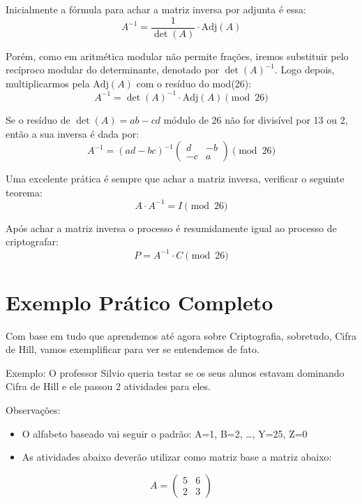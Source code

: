 \documentclass[a4paper,12pt,twocolumn]{article}
\begin{document}
Inicialmente a fórmula para achar a matriz inversa por adjunta é essa:
\begin{equation}
A^{-1} = \frac{1}{\det(A)} \cdot \text{Adj}(A)
\end{equation}

Porém, como em aritmética modular não permite frações, iremos substituir pelo recíproco modular do determinante, denotado por $\det(A)^{-1}$. Logo depois, multiplicarmos pela $\text{Adj}(A)$ com o resíduo do mod(26):
\begin{equation}
A^{-1} = \det(A)^{-1} \cdot \text{Adj}(A) \pmod{26}
\end{equation}

Se o resíduo de $\det(A) = ab - cd$ módulo de 26 não for divisível por 13 ou 2, então a sua inversa é dada por:
\begin{equation}
A^{-1} = (ad-bc)^{-1} \begin{pmatrix} d & -b \\ -c & a \end{pmatrix} \pmod{26}
\end{equation}

Uma excelente prática é sempre que achar a matriz inversa, verificar o seguinte teorema:
\begin{equation}
A \cdot A^{-1} = I \pmod{26}
\end{equation}

Após achar a matriz inversa o processo é resumidamente igual ao processo de criptografar:
\begin{equation}
P = A^{-1} \cdot C \pmod{26}
\end{equation}

\section{Exemplo Prático Completo}
Com base em tudo que aprendemos até agora sobre Criptografia, sobretudo, Cifra de Hill, vamos exemplificar para ver se entendemos de fato.

Exemplo: O professor Silvio queria testar se os seus alunos estavam dominando Cifra de Hill e ele passou 2 atividades para eles.

Observações:
\begin{itemize}
    \item O alfabeto baseado vai seguir o padrão: A=1, B=2, \dots, Y=25, Z=0
    \item As atividades abaixo deverão utilizar como matriz base a matriz abaixo:
\end{itemize}
\begin{equation}
A = \begin{pmatrix} 5 & 6 \\ 2 & 3 \end{pmatrix}
\end{equation}
\end{document}
